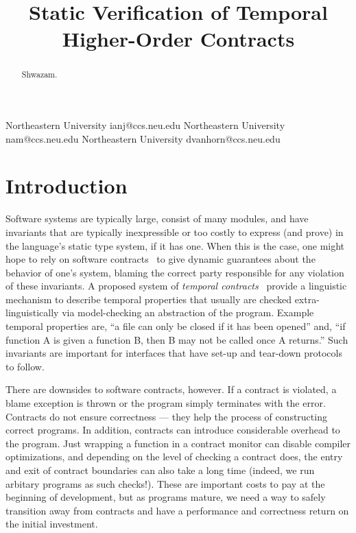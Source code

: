 \documentclass[preprint,onecolumn,9pt]{sigplanconf} %
\begin{document}
\copyrightdata{[to be supplied]}
\title{Static Verification of Temporal Higher-Order Contracts}

           {Northeastern University}
           {ianj@ccs.neu.edu}
           {Northeastern University}
           {nam@ccs.neu.edu}
           {Northeastern University}
           {dvanhorn@ccs.neu.edu}
\maketitle
\begin{abstract}
  Shwazam.
\end{abstract}

\section{Introduction}

Software systems are typically large, consist of many modules, and have invariants that are typically inexpressible or too costly to express (and prove) in the language's static type system, if it has one.
%
When this is the case, one might hope to rely on software contracts~\cite{dvanhorn:Findler2002Contracts} to give dynamic guarantees about the behavior of one's system, blaming the correct party responsible for any violation of these invariants.
%
A proposed system of \emph{temporal contracts}~\citep{ianjohnson:dfm:icfp2011} provide a linguistic mechanism to describe temporal properties that usually are checked extra-linguistically via model-checking an abstraction of the program.
%
Example temporal properties are, ``a file can only be closed if it has been opened'' and, ``if function A is given a function B, then B may not be called once A returns.''
%
Such invariants are important for interfaces that have set-up and tear-down protocols to follow.

There are downsides to software contracts, however.
%
If a contract is violated, a blame exception is thrown or the program simply terminates with the error.
%
Contracts do not ensure correctness --- they help the process of constructing correct programs.
%
In addition, contracts can introduce considerable overhead to the program.
%
Just wrapping a function in a contract monitor can disable compiler optimizations, and depending on the level of checking a contract does, the entry and exit of contract boundaries can also take a long time (indeed, we run arbitary programs as such checks!).
%
These are important costs to pay at the beginning of development, but as programs mature, we need a way to safely transition away from contracts and have a performance and correctness return on the initial investment.
\end{document}
